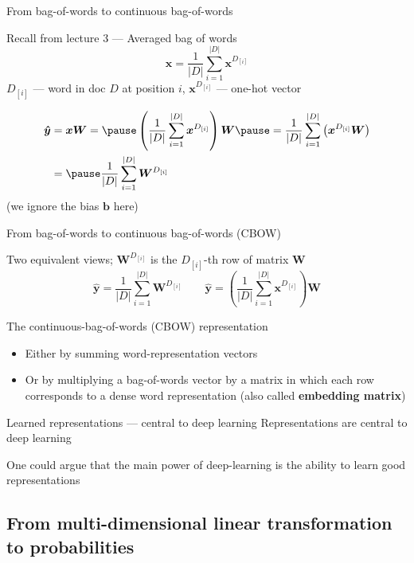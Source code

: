 \documentclass[12pt,aspectratio=169,handout]{beamer}
\begin{document}
\begin{frame}{From bag-of-words to continuous bag-of-words}
\begin{block}{Recall from lecture 3 --- Averaged bag of words}
$$\bm{x} = \frac{1}{|D|} \sum_{i =1}^{|D|} \bm{x}^{D_{[i]}}$$
$D_{[i]}$ --- word in doc $D$ at position $i$, $\bm{x}^{D_{[i]}}$ --- one-hot vector
\end{block}
$$
\begin{aligned}
\bm{\hat{y}} &= \bm{x} \bm{W} = \pause
\left (\frac{1}{|D|} \sum_{i =1}^{|D|} \bm{x}^{D_{[i]}} \right) \bm{W} 
\pause = \frac{1}{|D|} \sum_{i =1}^{|D|} \left ( \bm{x}^{D_{[i]}} \bm{W} \right)  \\
&= \pause \frac{1}{|D|} \sum_{i =1}^{|D|}  \bm{W}^{D_{[i]}} 
\end{aligned}
$$
(we ignore the bias $\bm{b}$ here)
	
\end{frame}

\begin{frame}{From bag-of-words to continuous bag-of-words (CBOW)}
\begin{block}{Two equivalent views; $\bm{W}^{D_{[i]}}$ is the $D_{[i]}$-th row of matrix $\bm{W}$}
$$
\bm{\hat{y}} = \frac{1}{|D|} \sum_{i =1}^{|D|} \bm{W}^{D_{[i]}}
\qquad
\bm{\hat{y}} = \left (\frac{1}{|D|} \sum_{i =1}^{|D|} \bm{x}^{D_{[i]}} \right) \bm{W} 
$$
\end{block}

\pause
The continuous-bag-of-words (CBOW) representation
\begin{itemize}
	\item \pause Either by summing word-representation vectors
	\item \pause Or by multiplying a bag-of-words vector by a matrix in which each row corresponds to a dense word representation (also called \textbf{embedding matrix})
\end{itemize}

\end{frame}

\begin{frame}{Learned representations --- central to deep learning}
Representations are central to deep learning

One could argue that the main power of deep-learning is the ability to learn good representations
\end{frame}


\subsection{From multi-dimensional linear transformation to probabilities}
\end{document}
